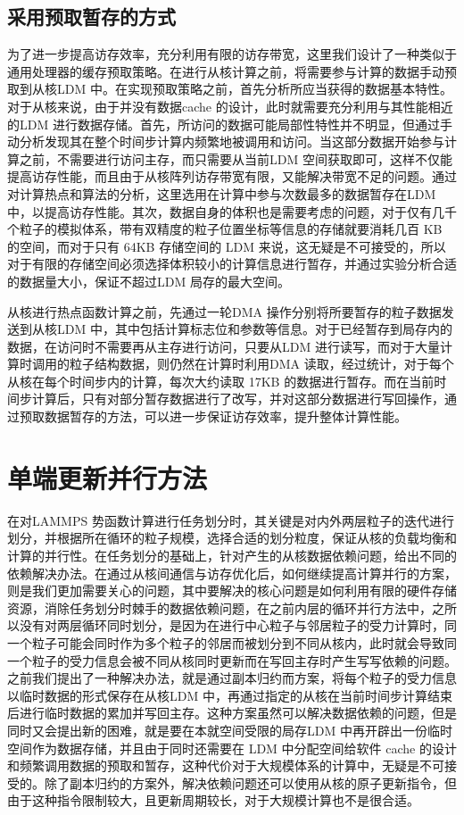 \subsection{采用预取暂存的方式}
为了进一步提高访存效率，充分利用有限的访存带宽，这里我们设计了一种类似于通用处理器的缓存预取策略。在进行从核计算之前，将需要参与计算的数据手动预取到从核LDM 中。在实现预取策略之前，首先分析所应当获得的数据基本特性。对于从核来说，由于并没有数据cache 的设计，此时就需要充分利用与其性能相近的LDM 进行数据存储。首先，所访问的数据可能局部性特性并不明显，但通过手动分析发现其在整个时间步计算内频繁地被调用和访问。当这部分数据开始参与计算之前，不需要进行访问主存，而只需要从当前LDM 空间获取即可，这样不仅能提高访存性能，而且由于从核阵列访存带宽有限，又能解决带宽不足的问题。通过对计算热点和算法的分析，这里选用在计算中参与次数最多的数据暂存在LDM 中，以提高访存性能。其次，数据自身的体积也是需要考虑的问题，对于仅有几千个粒子的模拟体系，带有双精度的粒子位置坐标等信息的存储就要消耗几百 KB 的空间，而对于只有 64KB 存储空间的 LDM 来说，这无疑是不可接受的，所以对于有限的存储空间必须选择体积较小的计算信息进行暂存，并通过实验分析合适的数据量大小，保证不超过LDM 局存的最大空间。

从核进行热点函数计算之前，先通过一轮DMA 操作分别将所要暂存的粒子数据发送到从核LDM 中，其中包括计算标志位和参数等信息。对于已经暂存到局存内的数据，在访问时不需要再从主存进行访问，只要从LDM 进行读写，而对于大量计算时调用的粒子结构数据，则仍然在计算时利用DMA 读取，经过统计，对于每个从核在每个时间步内的计算，每次大约读取 17KB 的数据进行暂存。而在当前时间步计算后，只有对部分暂存数据进行了改写，并对这部分数据进行写回操作，通过预取数据暂存的方法，可以进一步保证访存效率，提升整体计算性能。

\section{单端更新并行方法}
在对LAMMPS 势函数计算进行任务划分时，其关键是对内外两层粒子的迭代进行划分，并根据所在循环的粒子规模，选择合适的划分粒度，保证从核的负载均衡和计算的并行性。在任务划分的基础上，针对产生的从核数据依赖问题，给出不同的依赖解决办法。在通过从核间通信与访存优化后，如何继续提高计算并行的方案，则是我们更加需要关心的问题，其中要解决的核心问题是如何利用有限的硬件存储资源，消除任务划分时棘手的数据依赖问题，在之前内层的循环并行方法中，之所以没有对两层循环同时划分，是因为在进行中心粒子与邻居粒子的受力计算时，同一个粒子可能会同时作为多个粒子的邻居而被划分到不同从核内，此时就会导致同一个粒子的受力信息会被不同从核同时更新而在写回主存时产生写写依赖的问题。之前我们提出了一种解决办法，就是通过副本归约而方案，将每个粒子的受力信息以临时数据的形式保存在从核LDM 中，再通过指定的从核在当前时间步计算结束后进行临时数据的累加并写回主存。这种方案虽然可以解决数据依赖的问题，但是同时又会提出新的困难，就是要在本就空间受限的局存LDM 中再开辟出一份临时空间作为数据存储，并且由于同时还需要在 LDM 中分配空间给软件 cache 的设计和频繁调用数据的预取和暂存，这种代价对于大规模体系的计算中，无疑是不可接受的。除了副本归约的方案外，解决依赖问题还可以使用从核的原子更新指令，但由于这种指令限制较大，且更新周期较长，对于大规模计算也不是很合适。

